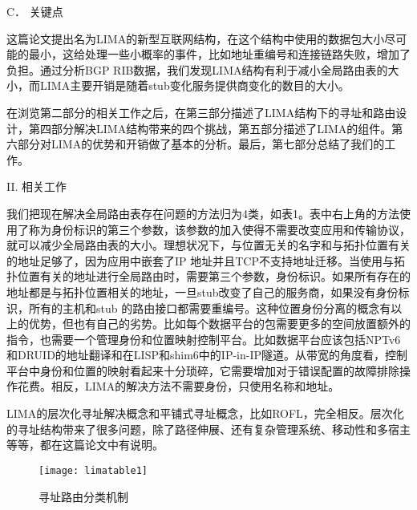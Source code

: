 \begin{flushleft}
C．	关键点
\end{flushleft}
\par 这篇论文提出名为LIMA的新型互联网结构，在这个结构中使用的数据包大小尽可能的最小，这给处理一些小概率的事件，比如地址重编号和连接链路失败，增加了负担。通过分析BGP RIB数据，我们发现LIMA结构有利于减小全局路由表的大小，而LIMA主要开销是随着stub变化服务提供商变化的数目的大小。
\par 在浏览第二部分的相关工作之后，在第三部分描述了LIMA结构下的寻址和路由设计，第四部分解决LIMA结构带来的四个挑战，第五部分描述了LIMA的组件。第六部分对LIMA的优势和开销做了基本的分析。最后，第七部分总结了我们的工作。

\begin{center}
II.	相关工作
\end{center}
\par 我们把现在解决全局路由表存在问题的方法归为4类，如表1。表中右上角的方法使用了称为身份标识的第三个参数，该参数的加入使得不需要改变应用和传输协议，就可以减少全局路由表的大小。理想状况下，与位置无关的名字和与拓扑位置有关的地址足够了，因为应用中嵌套了IP 地址并且TCP不支持地址迁移。当使用与拓扑位置有关的地址进行全局路由时，需要第三个参数，身份标识。如果所有存在的地址都是与拓扑位置相关的地址，一旦stub改变了自己的服务商，如果没有身份标识，所有的主机和stub 的路由接口都需要重编号。这种位置身份分离的概念有以上的优势，但也有自己的劣势。比如每个数据平台的包需要更多的空间放置额外的指令，也需要一个管理身份和位置映射控制平台。比如数据平台应该包括NPTv6和DRUID的地址翻译和在LISP和shim6中的IP-in-IP隧道。从带宽的角度看，控制平台中身份和位置的映射看起来十分琐碎，它需要增加对于错误配置的故障排除操作花费。相反，LIMA的解决方法不需要身份，只使用名称和地址。
\par LIMA的层次化寻址解决概念和平铺式寻址概念，比如ROFL，完全相反。层次化的寻址结构带来了很多问题，除了路径伸展、还有复杂管理系统、移动性和多宿主等等，都在这篇论文中有说明。

\begin{figure}
  \centering
  \texttt{[image: limatable1]}\\
  \caption{寻址路由分类机制}\label{fig:limatable1}
\end{figure}

